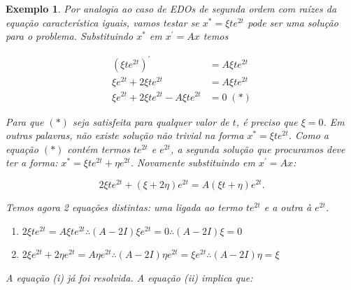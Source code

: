 \documentclass[a4paper,portuguese,9pt,final]{extarticle}
\newtheorem{example}{Exemplo}[section]
\begin{document}
\begin{multicols*}{2}
\begin{example}
                Por analogia ao caso de EDOs de segunda ordem com raízes da
                equação característica iguais, vamos testar se $x^{*} = \xi
                te^{2t}$ pode ser uma solução para o problema. Substituindo
                $x^{*}$ em $x^\prime = Ax$ temos
                
                \begin{equation*}
                    \begin{split}
                        (\xi te^{2t})^\prime &= A\xi te^{2t} \\
                         \xi e^{2t} + 2\xi te^{2t} &= A\xi te^{2t} \\
                         \xi e^{2t} + 2\xi te^{2t} - A\xi te^{2t} &= 0 \;(*)
                    \end{split}
                \end{equation*}
                
                Para que $(*)$ seja satisfeita para qualquer valor de $t$, é preciso que $\xi=0$. Em outras palavras, não existe solução não trivial na forma $x^{*} = \xi te^{2t}$. Como a equação $(*)$ contém termos $te^{2t}$ e $e^{2t}$, a segunda solução que procuramos deve ter a forma: $x^{*} = \xi te^{2t} + \eta e^{2t}$. Novamente substituindo em $x^\prime = Ax$:
                
                
                \begin{equation*}
                    2\xi t e^{2t} + (\xi + 2\eta)e^{2t} = A(\xi t + \eta) e^{2t}. 
                \end{equation*}
                
                Temos agora 2 equações distintas: uma ligada ao termo $t e^{2t}$ e a outra à $e^{2t}$.
                
                \begin{enumerate}[label=(\roman*)]
                    \item $2 \xi t e^{2t} = A\xi t e^{2t} \therefore (A-2I)\xi e^{2t} = 0 \therefore (A-2I)\xi = 0$ 
                    \item $2\xi e^{2t} + 2\eta e^{2t} = A \eta e^{2t} \therefore (A-2I) \eta e^{2t} = \xi e^{2t} \therefore (A-2I)\eta = \xi$
                \end{enumerate}
                
                A equação (i) já foi resolvida. A equação (ii) implica que:
                

\end{example}
\end{multicols*}
\end{document}
